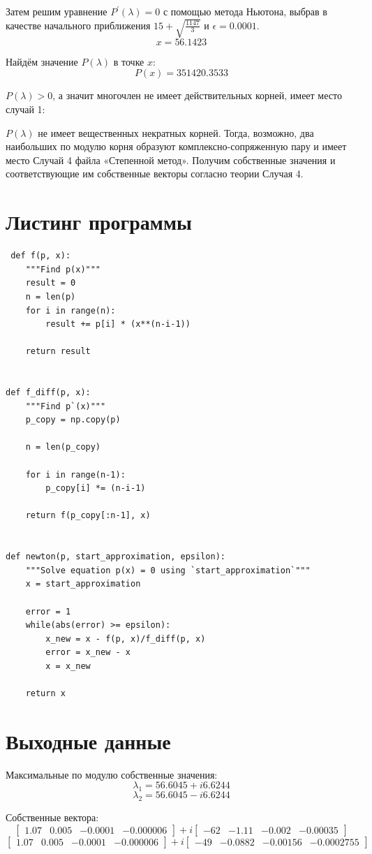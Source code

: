 \documentclass[12pt]{report}
\begin{document}
Затем решим уравнение $P^\prime(\lambda) = 0$ с помощью метода Ньютона, выбрав в качестве начального приближения $15 + \sqrt{\frac{1147}{3}}$ и $\epsilon = 0.0001$.
\[
x = 56.1423
\]

Найдём значение $P(\lambda)$ в точке $x$:
\[
P(x) = 351420.3533
\]

$P(\lambda) > 0$, а значит многочлен не имеет действительных корней, имеет место случай 1:

$P(\lambda)$ не имеет вещественных некратных корней. Тогда, возможно, два наибольших по модулю корня образуют комплексно-сопряженную пару и имеет место Случай 4 файла
«Степенной метод». Получим собственные значения и соответствующие им собственные
векторы согласно теории Случая 4. 

\section{Листинг программы}

\lstset{language=Python}
\lstset{extendedchars=\true}

\begin{lstlisting}
 def f(p, x):
	"""Find p(x)"""
	result = 0
	n = len(p)
	for i in range(n):
		result += p[i] * (x**(n-i-1))

	return result


def f_diff(p, x):
	"""Find p`(x)"""
	p_copy = np.copy(p)
	
	n = len(p_copy)

	for i in range(n-1):
		p_copy[i] *= (n-i-1)

	return f(p_copy[:n-1], x)


def newton(p, start_approximation, epsilon):
	"""Solve equation p(x) = 0 using `start_approximation`"""
	x = start_approximation

	error = 1
	while(abs(error) >= epsilon):
		x_new = x - f(p, x)/f_diff(p, x)
		error = x_new - x
		x = x_new

	return x

\end{lstlisting}

\section{Выходные данные}

Максимальные по модулю собственные значения:
\[
\lambda_1 = 56.6045 + i6.6244
\]
\[
\lambda_2 = 56.6045 - i6.6244 
\]

Собственные вектора:
\[
\begin{bmatrix}
1.07 & 0.005 & -0.0001 & -0.000006
\end{bmatrix}
+ i
\begin{bmatrix}
-62 & -1.11 & -0.002 & -0.00035
\end{bmatrix}
\]
\[
\begin{bmatrix}
1.07 & 0.005 & -0.0001 & -0.000006
\end{bmatrix}
+ i
\begin{bmatrix}
-49 & -0.0882 & -0.00156 & -0.0002755  
\end{bmatrix}
\]
\end{document}
